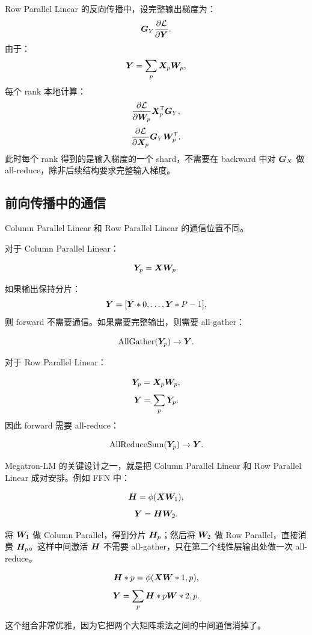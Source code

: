 Row Parallel Linear 的反向传播中，设完整输出梯度为：
\[
\bm{G}_Y
\frac{\partial \mathcal{L}}{\partial \bm{Y}}.
\]
由于：
\[
\bm{Y}=\sum_p \bm{X}_p\bm{W}_p,
\]
每个 rank 本地计算：
\[
\frac{\partial \mathcal{L}}{\partial \bm{W}_p}
\bm{X}_p^{\mathsf{T}}\bm{G}_Y,
\]
\[
\frac{\partial \mathcal{L}}{\partial \bm{X}_p}
\bm{G}_Y\bm{W}_p^{\mathsf{T}}.
\]
此时每个 rank 得到的是输入梯度的一个 shard，不需要在 backward 中对 $\bm{G}_X$ 做 all-reduce，除非后续结构要求完整输入梯度。

\subsection{前向传播中的通信}
\label{subsec:tp-forward-communication}

Column Parallel Linear 和 Row Parallel Linear 的通信位置不同。

对于 Column Parallel Linear：

\[
\bm{Y}_p=\bm{X}\bm{W}_p.
\]

如果输出保持分片：
\[
\bm{Y}=[\bm{Y}*0,\ldots,\bm{Y}*{P-1}],
\]
则 forward 不需要通信。如果需要完整输出，则需要 all-gather：

\[
\operatorname{AllGather}(\bm{Y}_p)\rightarrow \bm{Y}.
\]

对于 Row Parallel Linear：

\[
\bm{Y}_p=\bm{X}_p\bm{W}_p,
\]
\[
\bm{Y}=\sum_p\bm{Y}_p.
\]
因此 forward 需要 all-reduce：

\[
\operatorname{AllReduceSum}(\bm{Y}_p)\rightarrow \bm{Y}.
\]

Megatron-LM 的关键设计之一，就是把 Column Parallel Linear 和 Row Parallel Linear 成对安排。例如 FFN 中：

\[
\bm{H}=\phi(\bm{X}\bm{W}_1),
\]
\[
\bm{Y}=\bm{H}\bm{W}_2.
\]

将 $\bm{W}_1$ 做 Column Parallel，得到分片 $\bm{H}_p$；然后将 $\bm{W}_2$ 做 Row Parallel，直接消费 $\bm{H}_p$。这样中间激活 $\bm{H}$ 不需要 all-gather，只在第二个线性层输出处做一次 all-reduce。

\[
\bm{H}*p=\phi(\bm{X}\bm{W}*{1,p}),
\]
\[
\bm{Y}=
\sum_p
\bm{H}*p\bm{W}*{2,p}.
\]

这个组合非常优雅，因为它把两个大矩阵乘法之间的中间通信消掉了。


